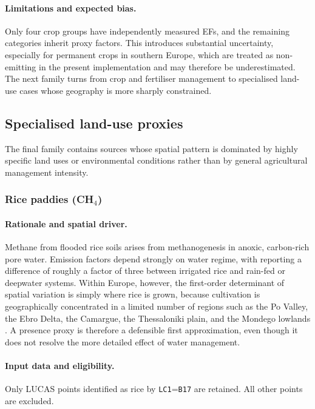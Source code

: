 \paragraph{Limitations and expected bias.}
Only four crop groups have independently measured EFs, and the
remaining categories inherit proxy factors. This introduces substantial
uncertainty, especially for permanent crops in southern Europe, which
are treated as non-emitting in the present implementation and may
therefore be underestimated. The next family turns from crop and
fertiliser management to specialised land-use cases whose geography is
more sharply constrained.

\subsection{Specialised land-use proxies}

The final family contains sources whose spatial pattern is dominated by
highly specific land uses or environmental conditions rather than by
general agricultural management intensity.

\subsubsection{Rice paddies (CH$_4$)}
\label{sec:proxy-rice}

\paragraph{Rationale and spatial driver.}
Methane from flooded rice soils arises from methanogenesis in anoxic,
carbon-rich pore water. Emission factors depend strongly on water
regime, with \citet{yann2009} reporting a difference of roughly a
factor of three between irrigated rice and rain-fed or deepwater
systems. Within Europe, however, the first-order determinant of spatial
variation is simply where rice is grown, because cultivation is
geographically concentrated in a limited number of regions such as the
Po Valley, the Ebro Delta, the Camargue, the Thessaloniki plain, and
the Mondego lowlands \citep{bogliani_2014}. A presence proxy is
therefore a defensible first approximation, even though it does not
resolve the more detailed effect of water management.

\paragraph{Input data and eligibility.}
Only LUCAS points identified as rice by \texttt{LC1}=\texttt{B17} are
retained. All other points are excluded.

